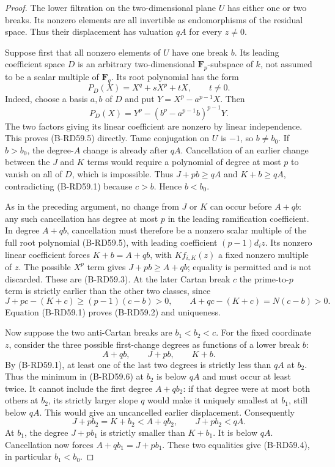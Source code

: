 \begin{proof}
The lower filtration on the two-dimensional plane $U$ has either
one or two breaks. Its nonzero elements are all invertible as
endomorphisms of the residual space. Thus their displacement has
valuation $qA$ for every $z\ne0$.

Suppose first that all nonzero elements of $U$ have one break $b$.
Its leading coefficient space $D$ is an arbitrary two-dimensional
$\mathbf F_p$-subspace of $k$, not assumed to be a scalar multiple
of $\mathbf F_q$. Its root polynomial has the form
\[
                    P_D(X)=X^q+sX^p+tX,\qquad t\ne0.   \tag{B-RD59.5}
\]
Indeed, choose a basis $a,b$ of $D$ and put
$Y=X^p-a^{p-1}X$. Then
\[
 P_D(X)=Y^p-(b^p-a^{p-1}b)^{p-1}Y.
\]
The two factors giving its linear coefficient are nonzero by
linear independence. This proves (B-RD59.5) directly.
Tame conjugation on $U$ is $-1$, so $b\ne b_0$.
If $b>b_0$, the degree-$A$ change is already after $qA$.
Cancellation of an earlier change between the $J$ and $K$ terms
would require a polynomial of degree at most $p$ to vanish on
all of $D$, which is impossible. Thus $J+pb\ge qA$ and
$K+b\ge qA$, contradicting (B-RD59.1) because $c>b$.
Hence $b<b_0$.

As in the preceding argument, no change from $J$ or $K$ can occur
before $A+qb$: any such cancellation has degree at most $p$ in
the leading ramification coefficient. In degree $A+qb$, cancellation
must therefore be a nonzero scalar multiple of the full root
polynomial (B-RD59.5), with leading coefficient $(p-1)d_i z$.
Its nonzero linear coefficient forces $K+b=A+qb$, with
$Kf_{i,K}(z)$ a fixed nonzero multiple of $z$.
The possible $X^p$ term gives $J+pb\ge A+qb$; equality is
permitted and is not discarded. These are (B-RD59.3).
At the later Cartan break $c$ the prime-to-$p$ term is strictly
earlier than the other two classes, since
\[
 J+pc-(K+c)\ge(p-1)(c-b)>0,\qquad
 A+qc-(K+c)=N(c-b)>0.
\]
Equation (B-RD59.1) proves (B-RD59.2) and uniqueness.

Now suppose the two anti-Cartan breaks are $b_1<b_2<c$.
For the fixed coordinate $z$, consider the three possible first-change
degrees as functions of a lower break $b$:
\[
             A+qb,\qquad J+pb,\qquad K+b.               \tag{B-RD59.6}
\]
By (B-RD59.1), at least one of the last two degrees is strictly
less than $qA$ at $b_2$. Thus the minimum in (B-RD59.6) at
$b_2$ is below $qA$ and must occur at least twice.
It cannot include the first degree $A+qb_2$: if that degree
were at most both others at $b_2$, its strictly larger slope
$q$ would make it uniquely smallest at $b_1$, still below
$qA$. This would give an uncancelled earlier displacement.
Consequently
\[
             J+pb_2=K+b_2<A+qb_2,\qquad
                              J+pb_2<qA.               \tag{B-RD59.7}
\]
At $b_1$, the degree $J+pb_1$ is strictly smaller than $K+b_1$.
It is below $qA$. Cancellation now forces
$A+qb_1=J+pb_1$. These two equalities give (B-RD59.4), in
particular $b_1<b_0$.


\end{proof}
